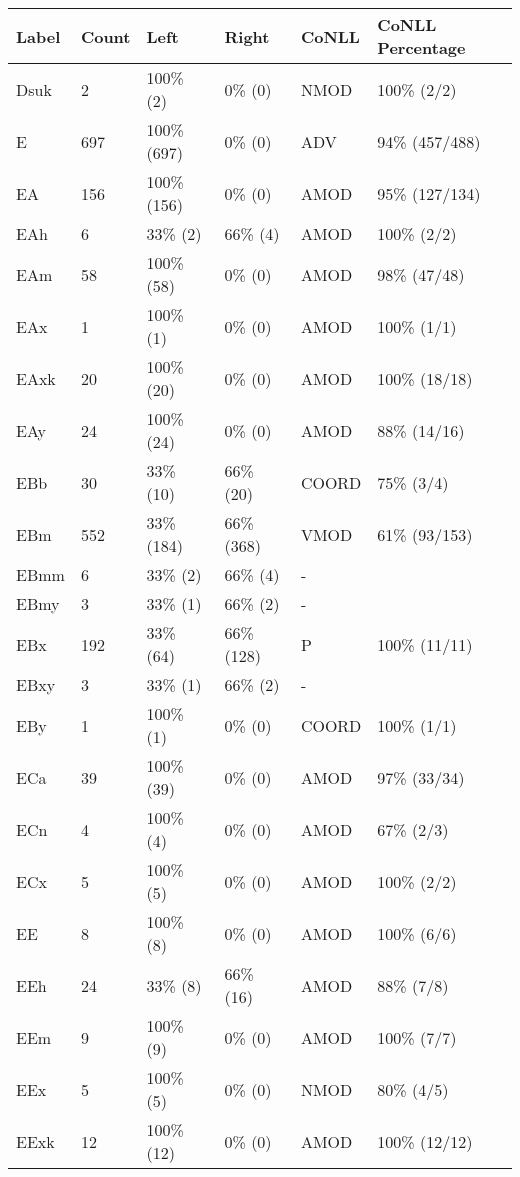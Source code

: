 \begin{figure*}
\begin{tabular}{|l|l|l|l||l|l|}
\hline
Label & Count & Left & Right & CoNLL & CoNLL Percentage\\ 
\hline
 Dsuk & 2 & 100\% (2) & 0\% (0) & NMOD & 100\% (2/2) \\ 
\hline
 E & 697 & 100\% (697) & 0\% (0) & ADV & 94\% (457/488) \\ 
\hline
 EA & 156 & 100\% (156) & 0\% (0) & AMOD & 95\% (127/134) \\ 
\hline
 EAh & 6 & 33\% (2) & 66\% (4) & AMOD & 100\% (2/2) \\ 
\hline
 EAm & 58 & 100\% (58) & 0\% (0) & AMOD & 98\% (47/48) \\ 
\hline
 EAx & 1 & 100\% (1) & 0\% (0) & AMOD & 100\% (1/1) \\ 
\hline
 EAxk & 20 & 100\% (20) & 0\% (0) & AMOD & 100\% (18/18) \\ 
\hline
 EAy & 24 & 100\% (24) & 0\% (0) & AMOD & 88\% (14/16) \\ 
\hline
 EBb & 30 & 33\% (10) & 66\% (20) & COORD & 75\% (3/4) \\ 
\hline
 EBm & 552 & 33\% (184) & 66\% (368) & VMOD & 61\% (93/153) \\ 
\hline
 EBmm & 6 & 33\% (2) & 66\% (4) & - &  \\ 
\hline
 EBmy & 3 & 33\% (1) & 66\% (2) & - &  \\ 
\hline
 EBx & 192 & 33\% (64) & 66\% (128) & P & 100\% (11/11) \\ 
\hline
 EBxy & 3 & 33\% (1) & 66\% (2) & - &  \\ 
\hline
 EBy & 1 & 100\% (1) & 0\% (0) & COORD & 100\% (1/1) \\ 
\hline
 ECa & 39 & 100\% (39) & 0\% (0) & AMOD & 97\% (33/34) \\ 
\hline
 ECn & 4 & 100\% (4) & 0\% (0) & AMOD & 67\% (2/3) \\ 
\hline
 ECx & 5 & 100\% (5) & 0\% (0) & AMOD & 100\% (2/2) \\ 
\hline
 EE & 8 & 100\% (8) & 0\% (0) & AMOD & 100\% (6/6) \\ 
\hline
 EEh & 24 & 33\% (8) & 66\% (16) & AMOD & 88\% (7/8) \\ 
\hline
 EEm & 9 & 100\% (9) & 0\% (0) & AMOD & 100\% (7/7) \\ 
\hline
 EEx & 5 & 100\% (5) & 0\% (0) & NMOD & 80\% (4/5) \\ 
\hline
 EExk & 12 & 100\% (12) & 0\% (0) & AMOD & 100\% (12/12) \\ 

\end{tabular}
\end{figure*}
